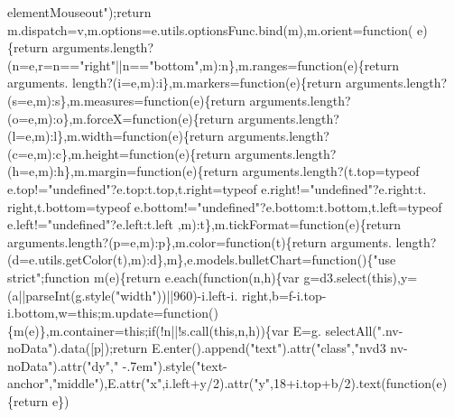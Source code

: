 \begin{DoxyCode}
{      elementMouseout"});\textcolor{keywordflow}{return} m.dispatch=v,m.options=e.utils.optionsFunc.bind(m),m.orient=\textcolor{keyword}{function}(
      e)\{\textcolor{keywordflow}{return} arguments.length?(n=e,r=n==\textcolor{stringliteral}{"right"}||n==\textcolor{stringliteral}{"bottom"},m):n\},m.ranges=\textcolor{keyword}{function}(e)\{\textcolor{keywordflow}{return} arguments.
      length?(i=e,m):i\},m.markers=\textcolor{keyword}{function}(e)\{\textcolor{keywordflow}{return} arguments.length?(s=e,m):s\},m.measures=\textcolor{keyword}{function}(e)\{\textcolor{keywordflow}{return} 
      arguments.length?(o=e,m):o\},m.forceX=\textcolor{keyword}{function}(e)\{\textcolor{keywordflow}{return} arguments.length?(l=e,m):l\},m.width=\textcolor{keyword}{function}(e)\{\textcolor{keywordflow}{return} 
      arguments.length?(c=e,m):c\},m.height=\textcolor{keyword}{function}(e)\{\textcolor{keywordflow}{return} arguments.length?(h=e,m):h\},m.margin=\textcolor{keyword}{function}(e)\{\textcolor{keywordflow}{return} 
      arguments.length?(t.top=typeof e.top!=\textcolor{stringliteral}{"undefined"}?e.top:t.top,t.right=typeof e.right!=\textcolor{stringliteral}{"undefined"}?e.right:t.
      right,t.bottom=typeof e.bottom!=\textcolor{stringliteral}{"undefined"}?e.bottom:t.bottom,t.left=typeof e.left!=\textcolor{stringliteral}{"undefined"}?e.left:t.left
      ,m):t\},m.tickFormat=\textcolor{keyword}{function}(e)\{\textcolor{keywordflow}{return} arguments.length?(p=e,m):p\},m.color=\textcolor{keyword}{function}(t)\{\textcolor{keywordflow}{return} arguments.
      length?(d=e.utils.getColor(t),m):d\},m\},e.models.bulletChart=\textcolor{keyword}{function}()\{\textcolor{stringliteral}{"use strict"};\textcolor{keyword}{function} 
      m(e)\{\textcolor{keywordflow}{return} e.each(\textcolor{keyword}{function}(n,h)\{var g=d3.select(\textcolor{keyword}{this}),y=(a||parseInt(g.style(\textcolor{stringliteral}{"width"}))||960)-i.left-i.
      right,b=f-i.top-i.bottom,w=\textcolor{keyword}{this};m.update=\textcolor{keyword}{function}()\{m(e)\},m.container=\textcolor{keyword}{this};\textcolor{keywordflow}{if}(!n||!s.call(\textcolor{keyword}{this},n,h))\{var E=g.
      selectAll(\textcolor{stringliteral}{".nv-noData"}).data([p]);\textcolor{keywordflow}{return} E.enter().append(\textcolor{stringliteral}{"text"}).attr(\textcolor{stringliteral}{"class"},\textcolor{stringliteral}{"nvd3 nv-noData"}).attr(\textcolor{stringliteral}{"dy"},\textcolor{stringliteral}{"
      -.7em"}).style(\textcolor{stringliteral}{"text-anchor"},\textcolor{stringliteral}{"middle"}),E.attr(\textcolor{stringliteral}{"x"},i.left+y/2).attr(\textcolor{stringliteral}{"y"},18+i.top+b/2).text(\textcolor{keyword}{function}(e)\{\textcolor{keywordflow}{return} e\})

\end{DoxyCode}
